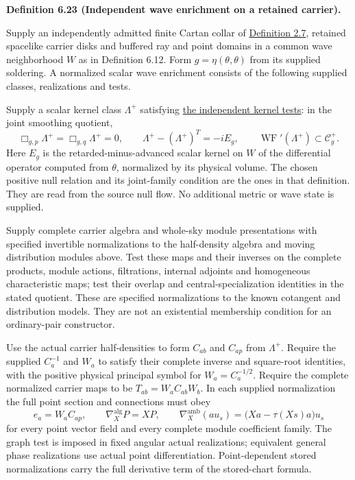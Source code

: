 \documentclass[
  english,
  11pt,
  reqno]{amsart}
\makeatletter
\newcommand{\pandocstatementheading}[1]{%
  \par\if@nobreak\else
    \addpenalty{\@beginparpenalty}%
    \addvspace{.5\baselineskip plus .2\baselineskip minus .2\baselineskip}%
  \fi
  {\normalfont\bfseries #1\par}%
  \nobreak\@afterindenttrue\@afterheading
}
\makeatother
\begin{document}
\pandocstatementheading{\leavevmode{}\label{def:online-independent-wave-enrichment}Definition 6.23 (Independent wave enrichment on a retained carrier).}

Supply an independently admitted finite Cartan collar of
\hyperref[def:online-finite-cartan-collar]{Definition 2.7}, retained
spacelike carrier disks and buffered ray and point domains in a common
wave neighborhood \(W\) as in Definition 6.12. Form
\(g=\eta(\theta,\theta)\) from its supplied soldering. A normalized
scalar wave enrichment consists of the following supplied classes,
realizations and tests.

Supply a scalar kernel class \(\Lambda^+\) satisfying
\hyperref[def:online-independent-wave-kernel]{the independent kernel
tests}: in the joint smoothing quotient,%
 \[
\Box_{g,p}\Lambda^+=\Box_{g,q}\Lambda^+=0,
\qquad
\Lambda^+-(\Lambda^+)^T=-iE_g,
\qquad
\operatorname{WF}'(\Lambda^+)\subset\mathcal C_g^+.
\] Here \(E_g\) is the retarded-minus-advanced scalar kernel on \(W\) of
the differential operator computed from \(\theta\), normalized by its
physical volume. The chosen positive null relation and its joint-family
condition are the ones in that definition. They are read from the source
null flow. No additional metric or wave state is supplied.

Supply complete carrier algebra and whole-sky module presentations with
specified invertible normalizations to the half-density algebra and
moving distribution modules above. Test these maps and their inverses on
the complete products, module actions, filtrations, internal adjoints
and homogeneous characteristic maps; test their overlap and
central-specialization identities in the stated quotient. These are
specified normalizations to the known cotangent and distribution models.
They are not an existential membership condition for an ordinary-pair
constructor.

Use the actual carrier half-densities to form \(C_{ab}\) and \(C_{ap}\)
from \(\Lambda^+\). Require the supplied \(C_a^{-1}\) and \(W_a\) to
satisfy their complete inverse and square-root identities, with the
positive physical principal symbol for \(W_a=C_a^{-1/2}\). Require the
complete normalized carrier maps to be \(T_{ab}=W_aC_{ab}W_b\). In each
supplied normalization the full point section and connections must obey%
\[
e_a=W_aC_{ap},\qquad
\nabla_X^{\mathrm{alg}}P=XP,\qquad
\nabla_X^{\mathrm{amb}}(a u_s)
=\bigl(Xa-\tau(Xs)a\bigr)u_s
\] for every point vector field and every complete module coefficient
family. The graph test is imposed in fixed angular actual realizations;
equivalent general phase realizations use actual point differentiation.
Point-dependent stored normalizations carry the full derivative term of
the stored-chart formula.
\end{document}
